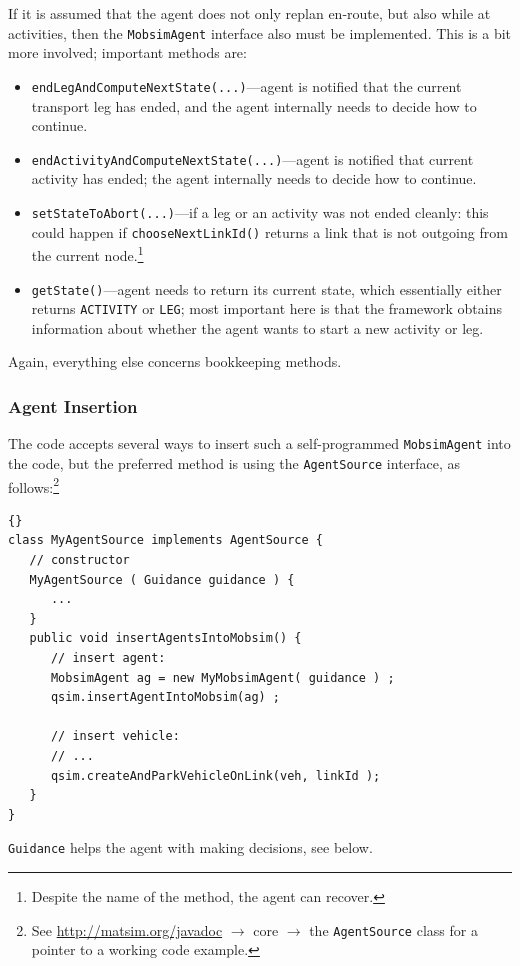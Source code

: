 If it is assumed that the agent does not only replan en-route, but also while at activities, then the \lstinline$MobsimAgent$ interface also must be implemented.  This is a bit more involved; important methods are:
\begin{itemize}\styleItemize
\item \lstinline$endLegAndComputeNextState(...)$---agent is notified that the current transport leg has ended, and the agent internally needs to decide how to continue.
\item \lstinline$endActivityAndComputeNextState(...)$---agent is notified that current activity has ended; the agent internally needs to decide how to continue.
\item \lstinline$setStateToAbort(...)$---if a leg or an activity was not ended cleanly: this could happen if \lstinline$chooseNextLinkId()$ returns a link that is not outgoing from the current node.\footnote{%
%
Despite the name of the method, the agent can recover.  %
}
\item \lstinline$getState()$---agent needs to return its current state, which essentially either returns \lstinline$ACTIVITY$ or \lstinline|LEG|; most important here  is that the framework obtains information about whether the agent wants to start a new activity or leg.
\end{itemize}
Again, everything else concerns bookkeeping methods.

\subsubsection{Agent Insertion}
The code accepts several ways to insert such a self-programmed \lstinline$MobsimAgent$ into the code, but the preferred method is using the \lstinline$AgentSource$ interface, as follows:\footnote{%
%
See \url{http://matsim.org/javadoc} $\to$ core $\to$ the \lstinline{AgentSource} class for a pointer to a working code example.
%
}
\begin{lstlisting}[basicstyle=\footnotesize\tt]{}
class MyAgentSource implements AgentSource {
   // constructor
   MyAgentSource ( Guidance guidance ) {
      ...
   }
   public void insertAgentsIntoMobsim() {
      // insert agent:
      MobsimAgent ag = new MyMobsimAgent( guidance ) ;
      qsim.insertAgentIntoMobsim(ag) ;
        
      // insert vehicle:
      // ...
      qsim.createAndParkVehicleOnLink(veh, linkId );
   }
}
\end{lstlisting}
\lstinline$Guidance$ helps the agent with making decisions, see below.

